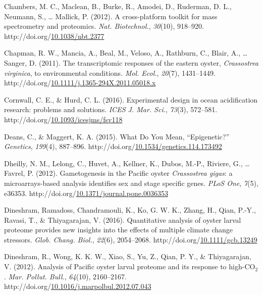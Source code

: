 \documentclass [11pt, proquest] {uwthesis}[2015/03/03]
\newlength{\cslhangindent}
\newenvironment{CSLReferences}%
{\setlength{\parindent}{0pt}%
\everypar{\setlength{\hangindent}{\cslhangindent}}\ignorespaces}%
{\par}
\begin{document}
\begin{CSLReferences}{1}{0}
\leavevmode\hypertarget{ref-Chambers2012}{}%
Chambers, M. C., Maclean, B., Burke, R., Amodei, D., Ruderman, D. L., Neumann, S., \ldots{} Mallick, P. (2012). {A cross-platform toolkit for mass spectrometry and proteomics}. \emph{Nat. Biotechnol.}, \emph{30}(10), 918--920. http://doi.org/\href{https://doi.org/10.1038/nbt.2377}{10.1038/nbt.2377}

\leavevmode\hypertarget{ref-Chapman2011}{}%
Chapman, R. W., Mancia, A., Beal, M., Veloso, A., Rathburn, C., Blair, A., \ldots{} Sanger, D. (2011). {The transcriptomic responses of the eastern oyster, \emph{Crassostrea virginica}, to environmental conditions}. \emph{Mol. Ecol.}, \emph{20}(7), 1431--1449. http://doi.org/\href{https://doi.org/10.1111/j.1365-294X.2011.05018.x}{10.1111/j.1365-294X.2011.05018.x}

\leavevmode\hypertarget{ref-Cornwall2016}{}%
Cornwall, C. E., \& Hurd, C. L. (2016). {Experimental design in ocean acidification research: problems and solutions}. \emph{ICES J. Mar. Sci.}, \emph{73}(3), 572--581. http://doi.org/\href{https://doi.org/10.1093/icesjms/fsv118}{10.1093/icesjms/fsv118}

\leavevmode\hypertarget{ref-Deans2015}{}%
Deans, C., \& Maggert, K. A. (2015). {What Do You Mean, {``Epigenetic?''}} \emph{Genetics}, \emph{199}(4), 887--896. http://doi.org/\href{https://doi.org/10.1534/genetics.114.173492}{10.1534/genetics.114.173492}

\leavevmode\hypertarget{ref-Dheilly2012}{}%
Dheilly, N. M., Lelong, C., Huvet, A., Kellner, K., Dubos, M.-P., Riviere, G., \ldots{} Favrel, P. (2012). {Gametogenesis in the Pacific oyster \emph{Crassostrea gigas}: a microarrays-based analysis identifies sex and stage specific genes}. \emph{PLoS One}, \emph{7}(5), e36353. http://doi.org/\href{https://doi.org/10.1371/journal.pone.0036353}{10.1371/journal.pone.0036353}

\leavevmode\hypertarget{ref-Dineshram2016}{}%
Dineshram, Ramadoss, Chandramouli, K., Ko, G. W. K., Zhang, H., Qian, P.-Y., Ravasi, T., \& Thiyagarajan, V. (2016). {Quantitative analysis of oyster larval proteome provides new insights into the effects of multiple climate change stressors}. \emph{Glob. Chang. Biol.}, \emph{22}(6), 2054--2068. http://doi.org/\href{https://doi.org/10.1111/gcb.13249}{10.1111/gcb.13249}

\leavevmode\hypertarget{ref-Dineshram2012}{}%
Dineshram, R., Wong, K. K. W., Xiao, S., Yu, Z., Qian, P. Y., \& Thiyagarajan, V. (2012). {Analysis of Pacific oyster larval proteome and its response to high-{CO\(_2\)}}. \emph{Mar. Pollut. Bull.}, \emph{64}(10), 2160--2167. http://doi.org/\href{https://doi.org/10.1016/j.marpolbul.2012.07.043}{10.1016/j.marpolbul.2012.07.043}


\end{CSLReferences}
\end{document}
